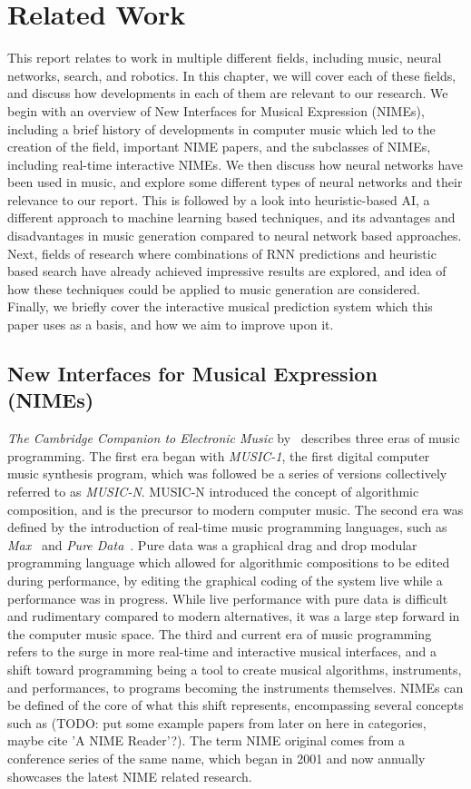 \chapter{Related Work}\label{chap:relatedWork}
This report relates to work in multiple different fields, including music, neural networks, search, and robotics. In this chapter, we will cover each of these fields, and discuss how developments in each of them are relevant to our research. We begin with an overview of New Interfaces for Musical Expression (NIMEs), including a brief history of developments in computer music which led to the creation of the field, important NIME papers, and the subclasses of NIMEs, including real-time interactive NIMEs. We then discuss how neural networks have been used in music, and explore some different types of neural networks and their relevance to our report. This is followed by a look into heuristic-based AI, a different approach to machine learning based techniques, and its advantages and disadvantages in music generation compared to neural network based approaches. Next, fields of research where combinations of RNN predictions and heuristic based search have already achieved impressive results are explored, and idea of how these techniques could be applied to music generation are considered. Finally, we briefly cover the interactive musical prediction system which this paper uses as a basis, and how we aim to improve upon it.

\section{New Interfaces for Musical Expression (NIMEs)}
\textit{The Cambridge Companion to Electronic Music} by~\cite{Collins2017Cambridge} describes three eras of music programming. The first era began with \textit{MUSIC-1}, the first digital computer music synthesis program, which was followed be a series of versions collectively referred to as \textit{MUSIC-N}. MUSIC-N introduced the concept of algorithmic composition, and is the precursor to modern computer music. The second era was defined by the introduction of real-time music programming languages, such as \textit{Max}~\citep{Puckette2002Max} and \textit{Pure Data}~\citep{Puckette1997PD}. Pure data was a graphical drag and drop modular programming language which allowed for algorithmic compositions to be edited during performance, by editing the graphical coding of the system live while a performance was in progress. While live performance with pure data is difficult and rudimentary compared to modern alternatives, it was a large step forward in the computer music space. The third and current era of music programming refers to the surge in more real-time and interactive musical interfaces, and a shift toward programming being a tool to create musical algorithms, instruments, and performances, to programs becoming the instruments themselves. NIMEs can be defined of the core of what this shift represents, encompassing several concepts such as (TODO: put some example papers from later on here in categories, maybe cite 'A NIME Reader'?). The term NIME original comes from a conference series of the same name, which began in 2001 and now annually showcases the latest NIME related research.
